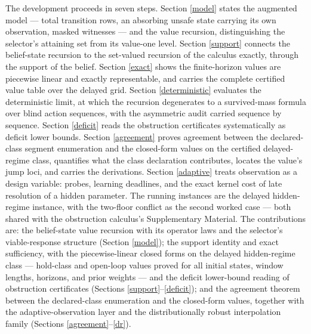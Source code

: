 \documentclass[10pt,twocolumn]{article}
\theoremstyle{plain}
\theoremstyle{definition}
\theoremstyle{remark}
\begin{document}
The development proceeds in seven steps. Section \ref{model} states the
augmented model --- total transition rows, an absorbing unsafe state
carrying its own observation, masked witnesses --- and the value recursion,
distinguishing the selector's attaining set from its value-one level.
Section \ref{support} connects the belief-state recursion to the
set-valued recursion of the calculus exactly, through the support of the
belief. Section \ref{exact} shows the finite-horizon values are piecewise
linear and exactly representable, and carries the complete certified value
table over the delayed grid. Section \ref{deterministic} evaluates the
deterministic limit, at which the recursion degenerates to a
survived-mass formula over blind action sequences, with the asymmetric
audit carried sequence by sequence. Section \ref{deficit} reads the
obstruction certificates systematically as deficit lower bounds. Section \ref{agreement} proves agreement between the declared-class
segment enumeration and the closed-form values on the certified
delayed-regime class,
quantifies what the class declaration contributes, locates the value's
jump loci, and carries the derivations. Section \ref{adaptive} treats
observation as a design variable: probes, learning deadlines, and the
exact kernel cost of late resolution of a hidden parameter. The running
instances are the delayed hidden-regime instance, with the two-floor
conflict as the second worked case --- both shared with the obstruction
calculus's Supplementary Material. The contributions are: the
belief-state value recursion with its operator laws and the selector's
viable-response structure (Section \ref{model}); the support identity
and exact sufficiency, with the piecewise-linear closed forms on the
delayed hidden-regime class --- hold-class and open-loop values proved
for all initial states, window lengths, horizons, and prior weights ---
and the deficit lower-bound reading of obstruction certificates (Sections
\ref{support}--\ref{deficit}); and the agreement theorem between the
declared-class enumeration and the closed-form values, together with the
adaptive-observation layer and the distributionally robust interpolation
family (Sections \ref{agreement}--\ref{dr}).
\end{document}
